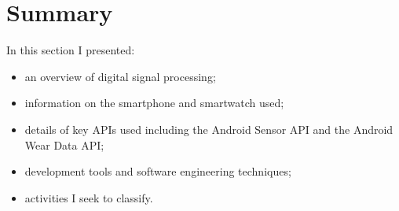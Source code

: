   \section{Summary}
    In this section I presented:
    \begin{itemize}
      \item an overview of digital signal processing;
      \item information on the smartphone and smartwatch used;
      \item details of key APIs used including the Android Sensor API and the Android Wear Data API;
      \item development tools and software engineering techniques;
      \item activities I seek to classify.
    \end{itemize}

